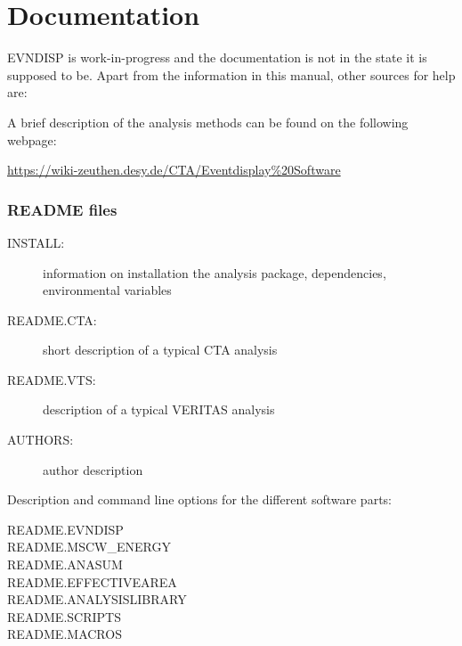 \documentclass[titlepage,a4paper,twoside,11pt]{report}
\newcommand{\clearemptydoublepage}{\newpage{\pagestyle{empty}\cleardoublepage}}
\begin{document}




\thispagestyle{empty}


\setcounter{page}{1}
\tableofcontents
\clearemptydoublepage



\chapter{Documentation}

EVNDISP is work-in-progress and the documentation is not in the state it is supposed to be. 
Apart from the information in this manual, other sources for help are:

A brief description of the analysis methods can be found on the following webpage:

\url{https://wiki-zeuthen.desy.de/CTA/Eventdisplay\%20Software}

\subsection*{README files}

\begin{description}
\item[INSTALL:]   information on installation the analysis package, dependencies, environmental variables
\item[README.CTA:]  short description of a typical CTA analysis
\item[README.VTS:]      description of a typical VERITAS analysis
\item[AUTHORS:]		author description
\end{description}

\noindent Description and command line options for the different software parts:

\begin{description}
\item[README.EVNDISP]
\item[README.MSCW\_ENERGY]
\item[README.ANASUM]
\item[README.EFFECTIVEAREA]
\item[README.ANALYSISLIBRARY]
\item[README.SCRIPTS]
\item[README.MACROS]
\end{description}
\end{document}
